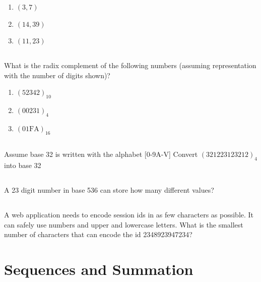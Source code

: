 \documentclass[twocolumn]{article}
\newcommand\mrk[1]{}
\begin{document}
  \begin{enumerate}
       \item $(3, 7)$ \mrk{1}
       \item $(14, 39)$ \mrk{1}
       \item $(11, 23)$ \mrk{1}
   \end{enumerate}

\subsection{}

    What is the radix complement of the following numbers (assuming representation with the number of digits shown)?

    \begin{enumerate}
        \item $(52342)_{10}$ \mrk{1}
        \item $(00231)_{4}$ \mrk{1}
        \item $(01\text{FA})_{16}$ \mrk{1}
    \end{enumerate}

\subsection{}

    Assume base 32 is written with the alphabet [0-9A-V] Convert $(321223123212)_4$ into base 32 \mrk{1}

\subsection{}

    A 23 digit number in base 536 can store how many different values? \mrk{1}

\subsection{}

    A web application needs to encode session ids in as few characters as possible. It can safely use numbers and upper and lowercase letters. What is the smallest number of characters that can encode the id 2348923947234? \mrk{1}

\clearpage
\section{Sequences and Summation}

\subsection{}
\end{document}
